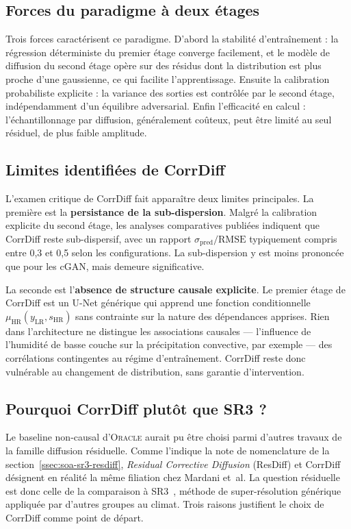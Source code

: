 \documentclass[14pt,a4paper,openany]{extreport}
\theoremstyle{definition}
\newcommand{\Oracle}{\textsc{Oracle}}
\newcommand{\LR}{\ensuremath{\text{LR}}}
\newcommand{\HR}{\ensuremath{\text{HR}}}
\newcommand{\yLR}{\ensuremath{y_{\LR}}}
\newcommand{\muHR}{\ensuremath{\mu_{\HR}}}
\begin{document}
\subsection{Forces du paradigme à deux étages}
\label{ssec:soa-corrdiff-forces}

Trois forces caractérisent ce paradigme. D'abord la stabilité d'entraînement : la régression déterministe du premier étage converge facilement, et le modèle de diffusion du second étage opère sur des résidus dont la distribution est plus proche d'une gaussienne, ce qui facilite l'apprentissage. Ensuite la calibration probabiliste explicite : la variance des sorties est contrôlée par le second étage, indépendamment d'un équilibre adversarial. Enfin l'efficacité en calcul : l'échantillonnage par diffusion, généralement coûteux, peut être limité au seul résiduel, de plus faible amplitude.

\subsection{Limites identifiées de CorrDiff}
\label{ssec:soa-corrdiff-limites}

L'examen critique de CorrDiff fait apparaître deux limites principales. La première est la \textbf{persistance de la sub-dispersion}. Malgré la calibration explicite du second étage, les analyses comparatives publiées indiquent que CorrDiff reste sub-dispersif, avec un rapport $\sigma_{\mathrm{pred}}/\mathrm{RMSE}$ typiquement compris entre 0,3 et 0,5 selon les configurations. La sub-dispersion y est moins prononcée que pour les cGAN, mais demeure significative.

La seconde est l'\textbf{absence de structure causale explicite}. Le premier étage de CorrDiff est un U-Net générique qui apprend une fonction conditionnelle $\muHR(\yLR, s_{\HR})$ sans contrainte sur la nature des dépendances apprises. Rien dans l'architecture ne distingue les associations causales --- l'influence de l'humidité de basse couche sur la précipitation convective, par exemple --- des corrélations contingentes au régime d'entraînement. CorrDiff reste donc vulnérable au changement de distribution, sans garantie d'intervention.

\subsection{Pourquoi CorrDiff plutôt que SR3 ?}
\label{ssec:soa-corrdiff-choix}

Le baseline non-causal d'\Oracle{} aurait pu être choisi parmi d'autres travaux de la famille diffusion résiduelle. Comme l'indique la note de nomenclature de la section~\ref{ssec:soa-sr3-resdiff}, \emph{Residual Corrective Diffusion} (ResDiff) et CorrDiff désignent en réalité la même filiation chez Mardani et~al. La question résiduelle est donc celle de la comparaison à SR3~\cite{saharia_sr3_2022}, méthode de super-résolution générique appliquée par d'autres groupes au climat. Trois raisons justifient le choix de CorrDiff comme point de départ.
\end{document}
